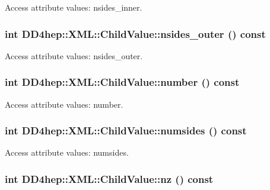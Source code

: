 Access attribute values: nsides\_\-inner. \hypertarget{struct_d_d4hep_1_1_x_m_l_1_1_child_value_a0b8fdaa55044eb598fae5081b7a4fa68}{
\subsubsection[{nsides\_\-outer}]{\setlength{\rightskip}{0pt plus 5cm}int DD4hep::XML::ChildValue::nsides\_\-outer () const}}
\label{struct_d_d4hep_1_1_x_m_l_1_1_child_value_a0b8fdaa55044eb598fae5081b7a4fa68}


Access attribute values: nsides\_\-outer. \hypertarget{struct_d_d4hep_1_1_x_m_l_1_1_child_value_a90e3cafc587a8ac9899593d4f43e01a4}{
\subsubsection[{number}]{\setlength{\rightskip}{0pt plus 5cm}int DD4hep::XML::ChildValue::number () const}}
\label{struct_d_d4hep_1_1_x_m_l_1_1_child_value_a90e3cafc587a8ac9899593d4f43e01a4}


Access attribute values: number. \hypertarget{struct_d_d4hep_1_1_x_m_l_1_1_child_value_abeb84838cec2c9bfa67f05e4c8b98f83}{
\subsubsection[{numsides}]{\setlength{\rightskip}{0pt plus 5cm}int DD4hep::XML::ChildValue::numsides () const}}
\label{struct_d_d4hep_1_1_x_m_l_1_1_child_value_abeb84838cec2c9bfa67f05e4c8b98f83}


Access attribute values: numsides. \hypertarget{struct_d_d4hep_1_1_x_m_l_1_1_child_value_af8cab783abcdf81dea15baa335d261c2}{
\subsubsection[{nz}]{\setlength{\rightskip}{0pt plus 5cm}int DD4hep::XML::ChildValue::nz () const}}
\label{struct_d_d4hep_1_1_x_m_l_1_1_child_value_af8cab783abcdf81dea15baa335d261c2}


